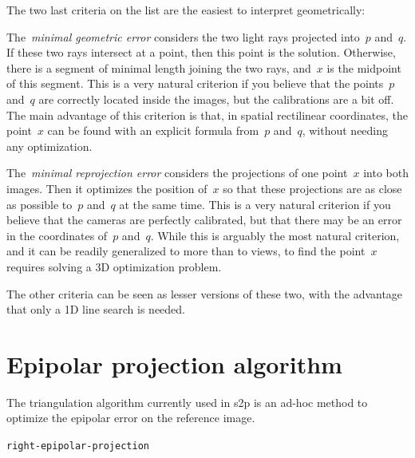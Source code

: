 The two last criteria on the list are the easiest to interpret geometrically:

The~\emph{minimal geometric error} considers the two light rays projected
into~$p$ and~$q$.  If these two rays intersect at a point, then this point is
the solution.  Otherwise, there is a segment of minimal length joining
the two rays, and~$x$ is the midpoint of this segment.  This is a very
natural criterion if you believe that the points~$p$ and~$q$ are correctly
located inside the images, but the calibrations are a bit off.
The main advantage of this criterion is that, in spatial rectilinear
coordinates, the point~$x$ can be found with an explicit formula from~$p$
and~$q$, without needing any optimization.

The~\emph{minimal reprojection error} considers the projections of one point~$x$
into both images.  Then it optimizes the position of~$x$ so that these
projections are as close as possible to~$p$ and~$q$ at the same time.  This
is a very natural criterion if you believe that the cameras are perfectly
calibrated, but that there may be an error in the coordinates of~$p$
and~$q$.  While this is arguably the most natural criterion, and it can be
readily generalized to more than to views, to find the point~$x$ requires
solving a 3D optimization problem.

The other criteria can be seen as lesser versions of these two, with the
advantage that only a 1D line search is needed.



\clearpage
\section{Epipolar projection algorithm}

The triangulation algorithm currently used in s2p is an ad-hoc method to
optimize the epipolar error on the reference image.

\begin{algorithm}[H]
	\caption{\tt right-epipolar-projection}\label{alg:epiright}

\end{algorithm}



